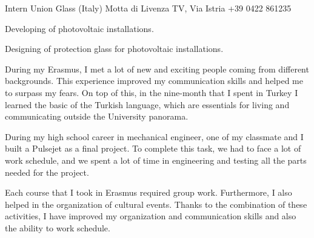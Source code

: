 \documentclass[english,a4paper]{europasscv}
\begin{document}
\begin{europasscv}
		 {
			Intern
		}
		\ecvitem{} {
			Union Glass (Italy) Motta di Livenza TV, Via Istria
			\newline +39 0422 861235
		}
		\ecvitem{} {
			\begin{ecvitemize}
				\item Developing of photovoltaic installations.
				\item Designing of protection glass for photovoltaic installations.
			\end{ecvitemize}
		}



		\ecvlanguageheader
		\ecvlanguagefooter

		 {
			\begin{ecvitemize}
				\item During my Erasmus, I met a lot of new and exciting people
					coming from different backgrounds. This experience improved
					my communication skills and helped me to surpass my fears.
					On top of this, in the nine-month that I spent in Turkey
					I learned the basic of the Turkish language, which are
					essentials for living and communicating outside the
					University panorama.
			\end{ecvitemize}
		}

		 {
			\begin{ecvitemize}
				\item During my high school career in mechanical engineer, one
					of my classmate and I built a Pulsejet as a final project.
					To complete this task, we had to face a lot of work schedule,
					and we spent a lot of time in engineering and testing all
					the parts needed for the project.
				\item Each course that I took in Erasmus required group work.
					Furthermore, I also helped in the organization of cultural
					events. Thanks to the combination of these activities, I
					have improved my organization and communication skills and
					also the ability to work schedule.
			\end{ecvitemize}
		}


\end{europasscv}
\end{document}
